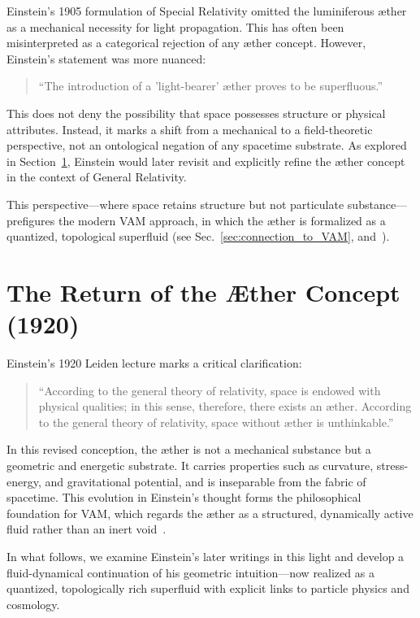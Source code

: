 Einstein’s 1905 formulation of Special Relativity omitted the luminiferous æther as a mechanical necessity for light propagation. This has often been misinterpreted as a categorical rejection of any æther concept. However, Einstein’s statement was more nuanced:
\begin{quote}
    ``The introduction of a 'light-bearer' æther proves to be superfluous.''
\end{quote}

This does not deny the possibility that space possesses structure or physical attributes. Instead, it marks a shift from a mechanical to a field-theoretic perspective, not an ontological negation of any spacetime substrate. As explored in Section~\ref{sec:einstein_return}, Einstein would later revisit and explicitly refine the æther concept in the context of General Relativity.

This perspective—where space retains structure but not particulate substance—prefigures the modern VAM approach, in which the æther is formalized as a quantized, topological superfluid (see Sec.~\ref{sec:connection_to_VAM}, and~\cite{VAM-8}).

\section{The Return of the Æther Concept (1920)}
\label{sec:einstein_return}

Einstein’s 1920 Leiden lecture marks a critical clarification:
\begin{quote}
    ``According to the general theory of relativity, space is endowed with physical qualities; in this sense, therefore, there exists an æther. According to the general theory of relativity, space without æther is unthinkable.''~\cite{einstein1920aether}
\end{quote}

In this revised conception, the æther is not a mechanical substance but a geometric and energetic substrate. It carries properties such as curvature, stress-energy, and gravitational potential, and is inseparable from the fabric of spacetime. This evolution in Einstein’s thought forms the philosophical foundation for VAM, which regards the æther as a structured, dynamically active fluid rather than an inert void~\cite{VAM-8}.

In what follows, we examine Einstein’s later writings in this light and develop a fluid-dynamical continuation of his geometric intuition—now realized as a quantized, topologically rich superfluid with explicit links to particle physics and cosmology.

